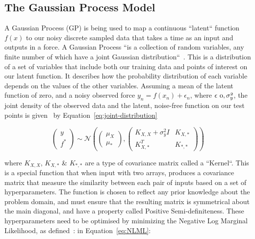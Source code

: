 \documentclass[12pt]{article}
\begin{document}
    \subsection{The Gaussian Process Model}
    A Gaussian Process (GP) is being used to map a continuous ``latent`` function $f(x)$ to our noisy discrete sampled data that takes a time as an input and outputs in a force.
    A Gaussian Process ``is a collection of random variables, any finite number of which have a joint Gaussian distribution``~\cite{rasmussen2006gaussian}.
    This is a distribution of a set of variables that include both our training data and points of interest on our latent function.
    It describes how the probability distribution of each variable depends on the values of the other variables.
    Assuming a mean of the latent function of zero, and a noisy observed force $y_n = f(x_n)+\epsilon_n$, where $\epsilon ~ \mathnormal{0, \sigma^2_y}$, the joint density of the observed data and the latent, noise-free function on our test points is given~\cite{murphy2023probabilistic} by Equation~\ref{eq:joint-distribution}

    \begin{equation}
        \begin{pmatrix}
            y \\
            f^*
        \end{pmatrix}
        \sim \mathcal{N} \left(
        \begin{pmatrix}
            \mu_X \\
            \mu_*
        \end{pmatrix},
        \begin{pmatrix}
            K_{X,X} + \sigma^2_y I & K_{X,*} \\
            K_{X,*}^T & K_{*,*}
        \end{pmatrix}
        \right)\label{eq:joint-distribution}
    \end{equation}

    where $K_{X,X}$, $K_{X,*}$ \& $K_{*,*}$ are a type of covariance matrix called a ``Kernel``.
    This is a special function that when input with two arrays, produces a covariance matrix that measure the similarity between each pair of inputs based on a set of hyperparameters.
    The function is chosen to reflect any prior knowledge about the problem domain, and must ensure that the resulting matrix is symmetrical about the main diagonal, and have a property called Positive Semi-definiteness.
    These hyperparameters need to be optimised by minimizing the Negative Log Marginal Likelihood, as defined~\cite{murphy2023probabilistic}: in Equation~\ref{eq:NLML}:
\end{document}

